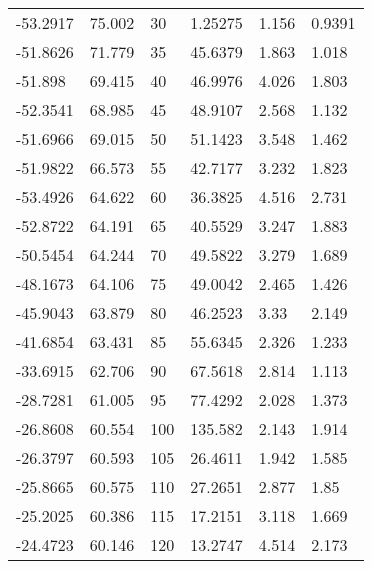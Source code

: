 \begin{longtable}[c]{@{}llllll@{}}
-53.2917 & 75.002 & 30 & 1.25275 & 1.156 & 0.9391 \\
-51.8626 & 71.779 & 35 & 45.6379 & 1.863 & 1.018 \\
-51.898 & 69.415 & 40 & 46.9976 & 4.026 & 1.803 \\
-52.3541 & 68.985 & 45 & 48.9107 & 2.568 & 1.132 \\
-51.6966 & 69.015 & 50 & 51.1423 & 3.548 & 1.462 \\
-51.9822 & 66.573 & 55 & 42.7177 & 3.232 & 1.823 \\
-53.4926 & 64.622 & 60 & 36.3825 & 4.516 & 2.731 \\
-52.8722 & 64.191 & 65 & 40.5529 & 3.247 & 1.883 \\
-50.5454 & 64.244 & 70 & 49.5822 & 3.279 & 1.689 \\
-48.1673 & 64.106 & 75 & 49.0042 & 2.465 & 1.426 \\
-45.9043 & 63.879 & 80 & 46.2523 & 3.33 & 2.149 \\
-41.6854 & 63.431 & 85 & 55.6345 & 2.326 & 1.233 \\
-33.6915 & 62.706 & 90 & 67.5618 & 2.814 & 1.113 \\
-28.7281 & 61.005 & 95 & 77.4292 & 2.028 & 1.373 \\
-26.8608 & 60.554 & 100 & 135.582 & 2.143 & 1.914 \\
-26.3797 & 60.593 & 105 & 26.4611 & 1.942 & 1.585 \\
-25.8665 & 60.575 & 110 & 27.2651 & 2.877 & 1.85 \\
-25.2025 & 60.386 & 115 & 17.2151 & 3.118 & 1.669 \\
-24.4723 & 60.146 & 120 & 13.2747 & 4.514 & 2.173 \\* \bottomrule
\end{longtable}
